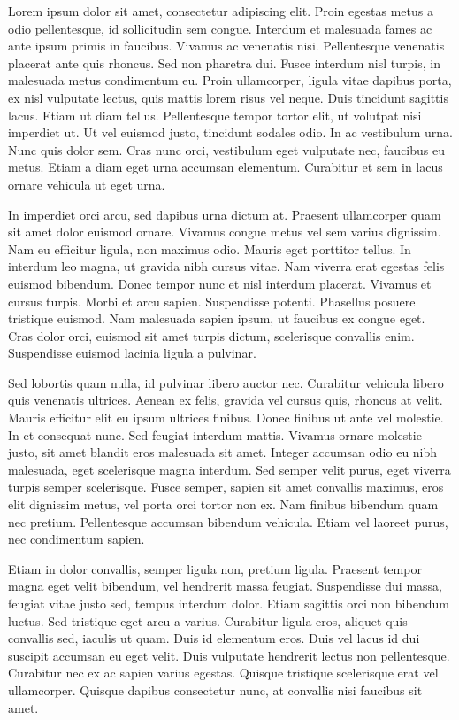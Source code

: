 \documentclass[12pt]{article}
\begin{document}
Lorem ipsum dolor sit amet, consectetur adipiscing elit. Proin egestas metus a odio pellentesque, id sollicitudin sem congue. Interdum et malesuada fames ac ante ipsum primis in faucibus. Vivamus ac venenatis nisi. Pellentesque venenatis placerat ante quis rhoncus. Sed non pharetra dui. Fusce interdum nisl turpis, in malesuada metus condimentum eu. Proin ullamcorper, ligula vitae dapibus porta, ex nisl vulputate lectus, quis mattis lorem risus vel neque. Duis tincidunt sagittis lacus. Etiam ut diam tellus. Pellentesque tempor tortor elit, ut volutpat nisi imperdiet ut. Ut vel euismod justo, tincidunt sodales odio. In ac vestibulum urna. Nunc quis dolor sem. Cras nunc orci, vestibulum eget vulputate nec, faucibus eu metus. Etiam a diam eget urna accumsan elementum. Curabitur et sem in lacus ornare vehicula ut eget urna.

In imperdiet orci arcu, sed dapibus urna dictum at. Praesent ullamcorper quam sit amet dolor euismod ornare. Vivamus congue metus vel sem varius dignissim. Nam eu efficitur ligula, non maximus odio. Mauris eget porttitor tellus. In interdum leo magna, ut gravida nibh cursus vitae. Nam viverra erat egestas felis euismod bibendum. Donec tempor nunc et nisl interdum placerat. Vivamus et cursus turpis. Morbi et arcu sapien. Suspendisse potenti. Phasellus posuere tristique euismod. Nam malesuada sapien ipsum, ut faucibus ex congue eget. Cras dolor orci, euismod sit amet turpis dictum, scelerisque convallis enim. Suspendisse euismod lacinia ligula a pulvinar.

Sed lobortis quam nulla, id pulvinar libero auctor nec. Curabitur vehicula libero quis venenatis ultrices. Aenean ex felis, gravida vel cursus quis, rhoncus at velit. Mauris efficitur elit eu ipsum ultrices finibus. Donec finibus ut ante vel molestie. In et consequat nunc. Sed feugiat interdum mattis. Vivamus ornare molestie justo, sit amet blandit eros malesuada sit amet. Integer accumsan odio eu nibh malesuada, eget scelerisque magna interdum. Sed semper velit purus, eget viverra turpis semper scelerisque. Fusce semper, sapien sit amet convallis maximus, eros elit dignissim metus, vel porta orci tortor non ex. Nam finibus bibendum quam nec pretium. Pellentesque accumsan bibendum vehicula. Etiam vel laoreet purus, nec condimentum sapien.

Etiam in dolor convallis, semper ligula non, pretium ligula. Praesent tempor magna eget velit bibendum, vel hendrerit massa feugiat. Suspendisse dui massa, feugiat vitae justo sed, tempus interdum dolor. Etiam sagittis orci non bibendum luctus. Sed tristique eget arcu a varius. Curabitur ligula eros, aliquet quis convallis sed, iaculis ut quam. Duis id elementum eros. Duis vel lacus id dui suscipit accumsan eu eget velit. Duis vulputate hendrerit lectus non pellentesque. Curabitur nec ex ac sapien varius egestas. Quisque tristique scelerisque erat vel ullamcorper. Quisque dapibus consectetur nunc, at convallis nisi faucibus sit amet.
\end{document}

